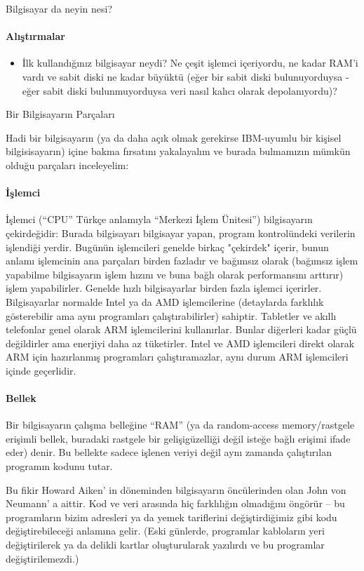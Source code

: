 \documentclass[10pt,a5paper]{book}
\begin{document}
\begin{section}{Bilgisayar da neyin nesi?}
\paragraph{Alıştırmalar}{
\begin{itemize}
 \item İlk kullandığınız bilgisayar neydi? Ne çeşit işlemci içeriyordu, ne kadar RAM'i vardı ve sabit diski ne kadar büyüktü (eğer bir sabit diski bulunuyorduysa - eğer sabit diski bulunmuyorduysa veri nasıl kalıcı olarak depolanıyordu)?
\end{itemize}}
\end{section}

\begin{section}{Bir Bilgisayarın Parçaları}

Hadi bir bilgisayarın (ya da daha açık olmak gerekirse IBM-uyumlu bir kişisel bilgisisayarın) içine bakma fırsatını yakalayalım ve burada bulmamızın mümkün olduğu parçaları inceleyelim:
\paragraph{İşlemci}{İşlemci (“CPU” Türkçe anlamıyla “Merkezi İşlem Ünitesi”) bilgisayarın çekirdeğidir: Burada bilgisayarı bilgisayar yapan, program kontrolündeki verilerin işlendiği yerdir. Bugünün işlemcileri genelde birkaç "çekirdek" içerir, bunun anlamı işlemcinin ana parçaları birden fazladır ve bağımsız olarak (bağımsız işlem yapabilme bilgisayarın işlem hızını ve buna bağlı olarak performansını arttırır) işlem yapabilirler.  Genelde hızlı bilgisayarlar birden fazla işlemci içerirler. Bilgisayarlar normalde Intel ya da AMD işlemcilerine (detaylarda farklılık gösterebilir ama aynı programları çalıştırabilirler) sahiptir. Tabletler ve akıllı telefonlar genel olarak ARM işlemcilerini kullanırlar. Bunlar diğerleri kadar güçlü değildirler ama enerjiyi daha az tüketirler. Intel ve AMD işlemcileri direkt olarak ARM için hazırlanmış programları çalıştıramazlar, aynı durum ARM işlemcileri içinde geçerlidir.}
\paragraph{Bellek}{Bir bilgisayarın çalışma belleğine “RAM” (ya da random-access memory/rastgele erişimli bellek, buradaki rastgele bir gelişigüzelliği değil isteğe bağlı erişimi ifade eder) denir. Bu bellekte sadece işlenen veriyi değil aynı zamanda çalıştırılan programın kodunu tutar.}

Bu fikir Howard Aiken' in döneminden bilgisayarın öncülerinden olan John von Neumann' a aittir. Kod ve veri arasında hiç farklılığın olmadığını öngörür – bu programların bizim adresleri ya da yemek tariflerini değiştirdiğimiz gibi kodu değiştirebileceği anlamına gelir. (Eski günlerde, programlar kabloların yeri değiştirilerek ya da delikli kartlar oluşturularak yazılırdı ve bu programlar değiştirilemezdi.)


\end{section}
\end{document}
